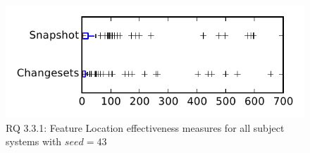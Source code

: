
\begin{figure}
\centering
\includegraphics[height=0.4\textheight]{figures/flt_seed/rq1_tiny_43}
\caption{RQ 3.3.1: Feature Location effectiveness measures for all subject systems with $seed=43$}
\label{fig:flt_seed:rq1:tiny}
\end{figure}
